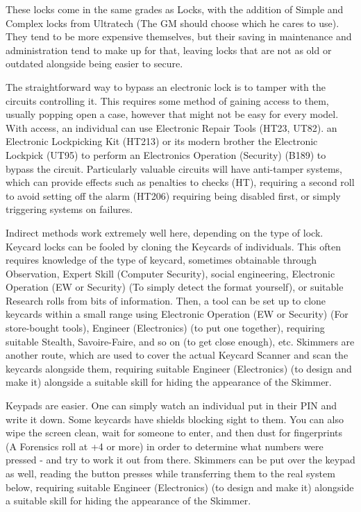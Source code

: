 \begin{multicols*}{2}
	These locks come in the same grades as Locks, with the addition of Simple and Complex locks from Ultratech (The GM should choose which he cares to use). They tend to be more expensive themselves, but their saving in maintenance and administration tend to make up for that, leaving locks that are not as old or outdated alongside being easier to secure.
	
	The straightforward way to bypass an electronic lock is to tamper with the circuits controlling it. This requires some method of gaining access to them, usually popping open a case, however that might not be easy for every model. With access, an individual can use Electronic Repair Tools (HT23, UT82). an Electronic Lockpicking Kit (HT213) or its modern brother the Electronic Lockpick (UT95) to perform an Electronics Operation (Security) (B189) to bypass the circuit. Particularly valuable circuits will have anti-tamper systems, which can provide effects such as penalties to checks (HT), requiring a second roll to avoid setting off the alarm (HT206) requiring being disabled first, or simply triggering systems on failures.
	
	Indirect methods work extremely well here, depending on the type of lock. Keycard locks can be fooled by cloning the Keycards of individuals. This often requires knowledge of the type of keycard, sometimes obtainable through Observation, Expert Skill (Computer Security), social engineering, Electronic Operation (EW or Security) (To simply detect the format yourself), or suitable Research rolls from bits of information. Then, a tool can be set up to clone keycards within a small range using Electronic Operation (EW or Security) (For store-bought tools), Engineer (Electronics) (to put one together), requiring suitable Stealth, Savoire-Faire, and so on (to get close enough), etc. Skimmers are another route, which are used to cover the actual Keycard Scanner and scan the keycards alongside them, requiring suitable Engineer (Electronics) (to design and make it) alongside a suitable skill for hiding the appearance of the Skimmer.
	
	Keypads are easier. One can simply watch an individual put in their PIN and write it down. Some keycards have shields blocking sight to them. You can also wipe the screen clean, wait for someone to enter, and then dust for fingerprints (A Forensics roll at +4 or more) in order to determine what numbers were pressed - and try to work it out from there. Skimmers can be put over the keypad as well, reading the button presses while transferring them to the real system below, requiring suitable Engineer (Electronics) (to design and make it) alongside a suitable skill for hiding the appearance of the Skimmer.
	

\end{multicols*}
